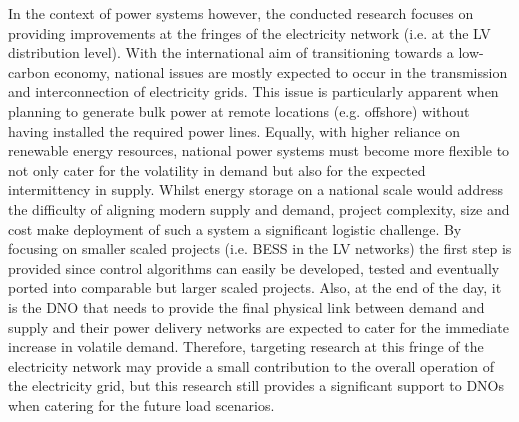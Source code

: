 In the context of power systems however, the conducted research focuses on providing improvements at the fringes of the electricity network (i.e. at the LV distribution level).
With the international aim of transitioning towards a low-carbon economy, national issues are mostly expected to occur in the transmission and interconnection of electricity grids.
This issue is particularly apparent when planning to generate bulk power at remote locations (e.g. offshore) without having installed the required power lines.
Equally, with higher reliance on renewable energy resources, national power systems must become more flexible to not only cater for the volatility in demand but also for the expected intermittency in supply.
Whilst energy storage on a national scale would address the difficulty of aligning modern supply and demand, project complexity, size and cost make deployment of such a system a significant logistic challenge.
By focusing on smaller scaled projects (i.e. BESS in the LV networks) the first step is provided since control algorithms can easily be developed, tested and eventually ported into comparable but larger scaled projects.
Also, at the end of the day, it is the DNO that needs to provide the final physical link between demand and supply and their power delivery networks are expected to cater for the immediate increase in volatile demand.
Therefore, targeting research at this fringe of the electricity network may provide a small contribution to the overall operation of the electricity grid, but this research still provides a significant support to DNOs when catering for the future load scenarios.
